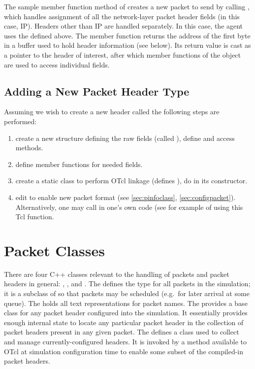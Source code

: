The sample member function  method
of  creates a new packet
to send by calling , which handles assignment
of all the network-layer packet header fields (in this case, IP).
Headers other than IP are handled separately.
In this case, the agent uses the  defined above.
The  member function returns the address
of the first byte in a buffer used to hold header information (see below).
Its return value is cast as a pointer to the header of interest,
after which member functions of the 
object are used to access individual fields.

\subsection{Adding a New Packet Header Type}

Assuming we wish to create a new header called 
the following steps are performed:
\begin{enumerate}\itemsep0pt
  \item create a new structure defining the raw fields
        (called ), define  and access
        methods. 
  \item define member functions for needed fields.
  \item create a static class to perform OTcl linkage
        (defines ), do 
        in its constructor. 
  \item edit  to enable new packet format
        (see \ref{sec:pinfoclass}, \ref{sec:configpacket}).
        Alternatively, one may call  in
        one's own code (see  for example
        of using this Tcl function. 
\end{enumerate}

\section{Packet Classes}
\label{sec:packetclasses}

There are four C++ classes relevant to the handling of packets
and packet headers in general: , 
, and .
The 
defines the type for all packets in the simulation;
it is a subclass of  so that packets may
be scheduled (e.g.~for later arrival at some queue).
The  holds all text
representations for packet names.
The  provides a base class for
any packet header configured into the simulation.
It essentially provides 
enough internal state to locate any particular packet
header in the collection of packet headers present in any given packet.
The 
defines a class used to collect and manage currently-configured headers.
It is invoked by a method available to OTcl at simulation configuration
time to enable some subset of the compiled-in packet headers.


